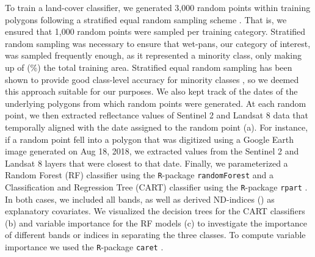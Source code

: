 \documentclass[../FinalThesis.tex]{subfiles}
\begin{document}
To train a land-cover classifier, we generated 3,000 random points within
training polygons following a stratified equal random sampling scheme
\citep{Shetty.2021}. That is, we ensured that 1,000 random points were sampled
per training category. Stratified random sampling was necessary to ensure that
wet-pans, our category of interest, was sampled frequently enough, as it
represented a minority class, only making up of
(\%) the total training area.
Stratified equal random sampling has been shown to provide good class-level
accuracy for minority classes \citep{Shetty.2021}, so we deemed this approach
suitable for our purposes. We also kept track of the dates of the underlying
polygons from which random points were generated. At each random point, we then
extracted reflectance values of Sentinel 2 and Landsat 8 data that temporally
aligned with the date assigned to the random point (a). For
instance, if a random point fell into a polygon that was digitized using a
Google Earth image generated on Aug 18, 2018, we extracted values from the
Sentinel 2 and Landsat 8 layers that were closest to that date. Finally, we
parameterized a Random Forest (RF) classifier using the \texttt{R}-package
\texttt{randomForest} \citep{Cutler.2024} and a Classification and Regression
Tree (CART) classifier using the \texttt{R}-package \texttt{rpart}
\citep{Therneau.2024b}. In both cases, we included all bands, as well as derived
ND-indices () as explanatory covariates. We visualized the decision
trees for the CART classifiers (b) and variable importance
for the RF models (c) to investigate the importance of
different bands or indices in separating the three classes. To compute variable
importance we used the \texttt{R}-package \texttt{caret} \citep{Kuhn.2008}.
\end{document}
